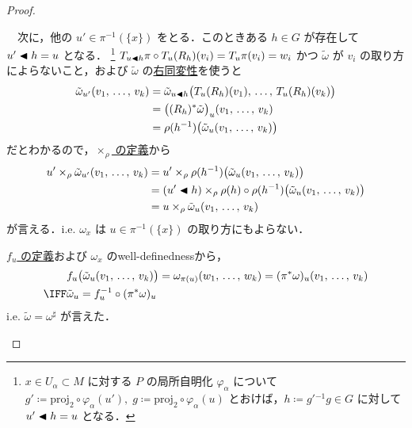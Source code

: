 \documentclass[TQFT_main]{subfiles}
\begin{document}
\begin{proof}
\begin{enumerate}
\begin{description}
\begin{description}
                　次に，他の $u' \in \pi^{-1}(\{x\})$ をとる．このときある $h \in G$ が存在して $u' \blacktriangleleft h = u$ となる．
                \footnote{
                    $x \in U_\alpha \subset M$ に対する $P$ の局所自明化 $\varphi_\alpha$ について $g' \coloneqq \mathrm{proj}_2 \circ \varphi_\alpha (u'),\; g \coloneqq \mathrm{proj}_2 \circ \varphi_\alpha (u)$ とおけば，$h \coloneqq g'{}^{-1}g \in G$ に対して $u' \blacktriangleleft h = u$ となる．
                }
                $T_{u \blacktriangleleft h} \pi \circ T_{u} (R_{h})(v_i) = T_{u} \pi (v_i) = w_i$ かつ $\tilde{\omega}$ が $v_i$ の取り方によらないこと，および $\tilde{\omega}$ の\hyperref[def:tensorial-form]{右同変性}を使うと
                \begin{align}
                    \tilde{\omega}_{u'} (v_1,\, \dots,\, v_k)
                    &= \tilde{\omega}_{u \blacktriangleleft h} \bigl(T_{u}(R_h)(v_1),\, \dots,\, T_{u}(R_h)(v_k)\bigr) \\
                    &= \bigl((R_h)^* \tilde{\omega}\bigr)_u (v_1,\, \dots,\, v_k) \\
                    &= \rho(h^{-1})\bigl(\tilde{\omega}_u (v_1,\, \dots,\, v_k)\bigr)
                \end{align}
                だとわかるので，\hyperref[prop:Borelconst]{$\times_\rho$ の定義}から
                \begin{align}
                    u' \times_\rho \tilde{\omega}_{u'} (v_1,\, \dots,\, v_k)
                    &= u ' \times_\rho \rho(h^{-1})\bigl(\tilde{\omega}_u (v_1,\, \dots,\, v_k)\bigr) \\
                    &= (u ' \blacktriangleleft h) \times_\rho \rho(h) \circ \rho(h^{-1})\bigl(\tilde{\omega}_u (v_1,\, \dots,\, v_k)\bigr) \\
                    &= u \times_\rho \tilde{\omega}_u (v_1,\, \dots,\, v_k)
                \end{align}
                が言える．i.e. $\omega_x$ は $u \in \pi^{-1}(\{x\})$ の取り方にもよらない．
            \end{description}
            \hyperref[lem:assoc-basic]{$f_u$ の定義}および $\omega_x$ のwell-definednessから，
            \begin{align}
                &f_u \bigl(\tilde{\omega}_u(v_1,\, \dots,\, v_k)\bigr) = \omega_{\pi(u)}(w_1,\, \dots,\, w_k) = (\pi^* \omega)_u (v_1,\, \dots,\, v_k) \\
                \IFF &\tilde{\omega}_u = f_u^{-1} \circ (\pi^* \omega)_u
            \end{align}
            i.e. $\tilde{\omega} = \omega^\sharp$ が言えた．

\end{description}
\end{enumerate}
\end{proof}
\end{document}
